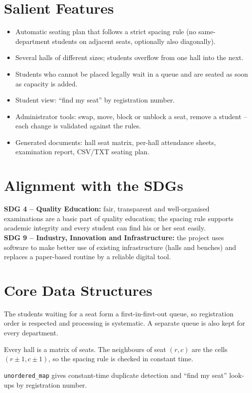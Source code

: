 \documentclass[12pt,a4paper]{report}
\begin{document}
\section{Salient Features}
\begin{itemize}
  \item Automatic seating plan that follows a strict spacing rule (no same-department students on adjacent seats, optionally also diagonally).
  \item Several halls of different sizes; students overflow from one hall into the next.
  \item Students who cannot be placed legally wait in a queue and are seated as soon as capacity is added.
  \item Student view: ``find my seat'' by registration number.
  \item Administrator tools: swap, move, block or unblock a seat, remove a student -- each change is validated against the rules.
  \item Generated documents: hall seat matrix, per-hall attendance sheets, examination report, CSV/TXT seating plan.
\end{itemize}

\section{Alignment with the SDGs}
\textbf{SDG 4 -- Quality Education:} fair, transparent and well-organised examinations are a basic part of quality education; the spacing rule supports academic integrity and every student can find his or her seat easily.\\
\textbf{SDG 9 -- Industry, Innovation and Infrastructure:} the project uses software to make better use of existing infrastructure (halls and benches) and replaces a paper-based routine by a reliable digital tool.

\section{Core Data Structures}
\begin{description}[leftmargin=2.2cm,style=nextline]
  \item[Queue] The students waiting for a seat form a first-in-first-out queue, so registration order is respected and processing is systematic. A separate queue is also kept for every department.
  \item[Matrix (2D array)] Every hall is a matrix of seats. The neighbours of seat $(r,c)$ are the cells $(r\pm1,c\pm1)$, so the spacing rule is checked in constant time.
  \item[Hash table] \texttt{unordered\_map} gives constant-time duplicate detection and ``find my seat'' look-ups by registration number.
\end{description}
\end{document}

